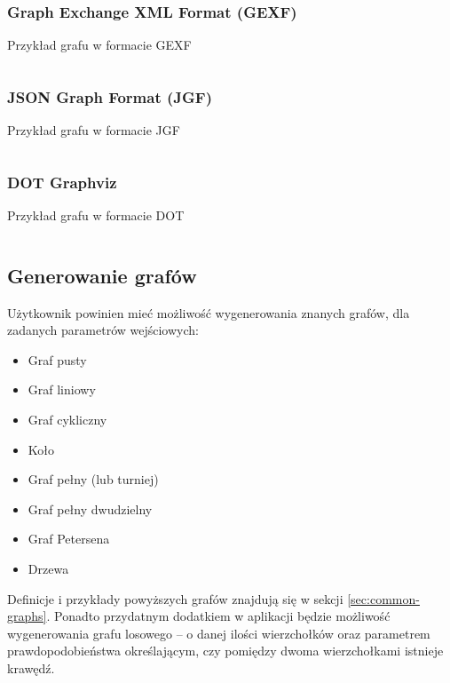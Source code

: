 \subsubsection{Graph Exchange XML Format (GEXF)}
\begin{listing}[H]
    \caption{Przykład grafu w formacie GEXF}
    \inputminted{xml}{example.gexf}
    \label{lst:gexf-example}
\end{listing}

\subsubsection{JSON Graph Format (JGF)} 
\begin{listing}[H]
    \caption{Przykład grafu w formacie JGF}
    \inputminted{json}{example.json}
    \label{lst:jgf-example}
\end{listing}

\subsubsection{DOT Graphviz} 
\begin{listing}[H]
    \caption{Przykład grafu w formacie DOT}
    \inputminted{text}{example.gv}
    \label{lst:dot-example}
\end{listing}

\subsection{Generowanie grafów}

Użytkownik powinien mieć możliwość wygenerowania znanych grafów, dla zadanych parametrów wejściowych:

\begin{itemize}
\setlength\itemsep{0em}
\item Graf pusty
\item Graf liniowy
\item Graf cykliczny
\item Koło
\item Graf pełny (lub turniej)
\item Graf pełny dwudzielny
\item Graf Petersena
\item Drzewa
\end{itemize}

Definicje i przykłady powyższych grafów znajdują się w sekcji \ref{sec:common-graphs}. Ponadto przydatnym dodatkiem w aplikacji będzie możliwość wygenerowania grafu losowego -- o danej ilości wierzchołków oraz parametrem prawdopodobieństwa określającym, czy pomiędzy dwoma wierzchołkami istnieje krawędź.  

